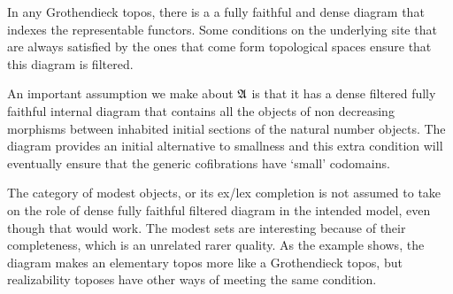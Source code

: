 \documentclass[csh.tex]{subfiles}
\begin{document}
\begin{example} In any Grothendieck topos, there is a a fully faithful and dense
  diagram that indexes the representable functors. Some conditions on the 
  underlying site that are always satisfied by the ones that come form 
  topological spaces ensure that this diagram is filtered.
\end{example}

\begin{remark} %
An important assumption we make about $\mathfrak A$ is that it has a 
dense filtered fully faithful internal diagram that contains all the objects 
of non decreasing morphisms between inhabited initial sections of the natural 
number objects. The diagram provides an initial alternative to smallness and 
this extra condition will eventually ensure that the generic cofibrations have 
`small' codomains.
\end{remark}

\begin{remark} The category of modest objects, or its ex/lex completion is not
  assumed to take on the role of dense fully faithful filtered diagram in the
  intended model, even though that would work. The modest sets are
  interesting because of their completeness, which is an unrelated rarer
  quality.
  As the example shows, the diagram makes an elementary topos more like a
  Grothendieck topos, but realizability toposes have other ways of meeting the
  same condition.
\end{remark}
\end{document}
